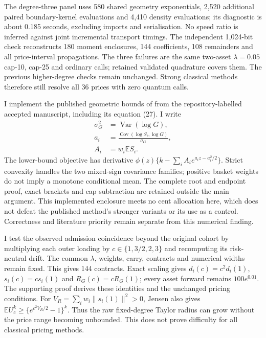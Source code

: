 \documentclass[11pt]{article}
\newcommand{\E}{\mathbb E}
\begin{document}
The degree-three panel uses 580 shared geometry exponentials, 2,520
additional paired boundary-kernel evaluations and 4,410 density evaluations;
its diagnostic is about 0.185 seconds, excluding imports and serialisation.
No speed ratio is inferred against joint incremental transport timings.
The independent 1,024-bit check reconstructs 180 moment enclosures,
144 coefficients, 108 remainders and all price-interval propagations.
The three failures are the same two-asset $\lambda=0.05$ cap-10,
cap-25 and ordinary calls; retained validated quadrature covers them.
The previous higher-degree checks remain unchanged. Strong classical
methods therefore still resolve all 36 prices with zero quantum calls.

I implement the published geometric bounds of \citet{caldana} from the
repository-labelled accepted manuscript, including its equation (27).
I write
\begin{equation}
\begin{aligned}
\sigma_G^2 &= \operatorname{Var}(\log G),\\
a_i &= \frac{\operatorname{Cov}(\log S_i,\log G)}{\sigma_G},\\
A_i &= w_i\E S_i.
\end{aligned}
\end{equation}
The lower-bound objective has derivative
$\phi(z)\{k-\sum_i A_ie^{a_i z-a_i^2/2}\}$.
Strict convexity handles the two mixed-sign covariance families; positive
basket weights do not imply a monotone conditional mean. The complete
root and endpoint proof, exact brackets and cap subtraction are retained
outside the main argument. This implemented enclosure meets no cent
allocation here, which does not defeat the published method's stronger
variants or its use as a control. Correctness and literature priority
remain separate from this numerical finding.

I test the observed admission coincidence beyond the original cohort
by multiplying each outer loading by $c\in\{1,3/2,2,3\}$ and recomputing
its risk-neutral drift. The common $\lambda$, weights, carry, contracts
and numerical widths remain fixed. This gives 144 contracts. Exact
scaling gives $d_i(c)=c^2d_i(1)$, $s_i(c)=cs_i(1)$ and
$R_G(c)=cR_G(1)$; every asset forward remains $100e^{0.01}$.
The supporting proof derives these identities and the unchanged pricing
conditions. For $V_R=\sum_iw_i\|s_i(1)\|^2>0$, Jensen also gives
$\E U_c^k\geq\{e^{c^2V_R/2}-1\}^k$. Thus the raw fixed-degree
Taylor radius can grow without the price range becoming unbounded.
This does not prove difficulty for all classical pricing methods.
\end{document}
